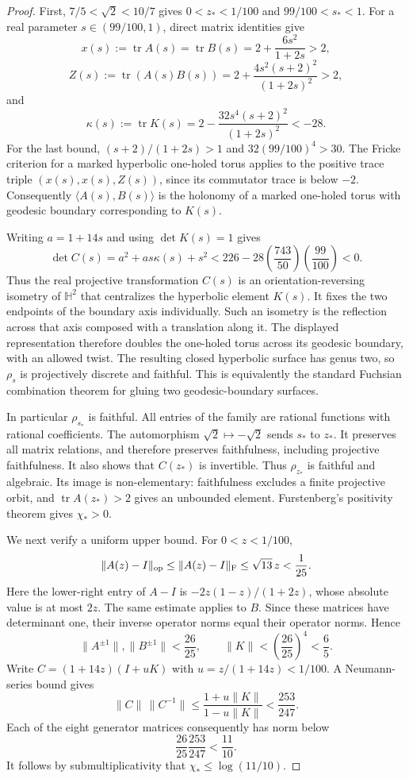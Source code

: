 \documentclass[11pt,letterpaper]{amsart}
\theoremstyle{definition}
\theoremstyle{remark}
\numberwithin{equation}{section}
\begin{document}
\begin{proof}
First, $7/5<\sqrt2<10/7$ gives $0<z_*<1/100$ and
$99/100<s_*<1$. For a real parameter $s\in(99/100,1)$, direct matrix
identities give
\[
 x(s):=\operatorname{tr}A(s)=\operatorname{tr}B(s)
       =2+\frac{6s^2}{1+2s}>2,
\]
\[
 Z(s):=\operatorname{tr}(A(s)B(s))
       =2+\frac{4s^2(s+2)^2}{(1+2s)^2}>2,
\]
and
\[
 \kappa(s):=\operatorname{tr}K(s)
       =2-\frac{32s^4(s+2)^2}{(1+2s)^2}<-28.
\]
For the last bound, $(s+2)/(1+2s)>1$ and
$32(99/100)^4>30$. The Fricke criterion \cite[Theorem 4.1.2]{GoldmanFricke} for a marked hyperbolic
one-holed torus applies to the positive trace triple
$(x(s),x(s),Z(s))$, since its commutator trace is below $-2$.
Consequently $\langle A(s),B(s)\rangle$ is the holonomy of a marked
one-holed torus with geodesic boundary corresponding to $K(s)$.

Writing $a=1+14s$ and using $\det K(s)=1$ gives
\[
 \det C(s)=a^2+as\kappa(s)+s^2
 <226-28\left(\frac{743}{50}\right)\left(\frac{99}{100}\right)<0.
\]
Thus the real projective transformation $C(s)$ is an
orientation-reversing isometry of $\mathbb H^2$ that centralizes the
hyperbolic element $K(s)$. It fixes the two endpoints of the boundary
axis individually. Such an isometry is the reflection across that axis
composed with a translation along it. The displayed representation
therefore doubles the one-holed torus across its geodesic boundary,
with an allowed twist. The resulting closed hyperbolic surface has
genus two, so $\rho_s$ is projectively discrete and faithful.
This is equivalently the standard Fuchsian combination theorem for
gluing two geodesic-boundary surfaces.

In particular $\rho_{s_*}$ is faithful. All entries of the family are
rational functions with rational coefficients. The automorphism
$\sqrt2\mapsto-\sqrt2$ sends $s_*$ to $z_*$. It preserves all matrix
relations, and therefore preserves faithfulness, including projective
faithfulness. It also shows that $C(z_*)$ is invertible. Thus
$\rho_{z_*}$ is faithful and algebraic. Its image is non-elementary:
faithfulness excludes a finite projective orbit, and
$\operatorname{tr}A(z_*)>2$ gives an unbounded element. Furstenberg's
positivity theorem gives $\chi_*>0$.

We next verify a uniform upper bound. For $0<z<1/100$,
\[
 \|A(z)-I\|_{\rm op}\le\|A(z)-I\|_{\rm F}
 \le\sqrt{13}\,z<\frac1{25}.
\]
Here the lower-right entry of $A-I$ is
$-2z(1-z)/(1+2z)$, whose absolute value is at most $2z$.
The same estimate applies to $B$. Since these matrices have determinant
one, their inverse operator norms equal their operator norms. Hence
\[
 \|A^{\pm1}\|,\|B^{\pm1}\|<\frac{26}{25},\qquad
 \|K\|<\left(\frac{26}{25}\right)^4<\frac65.
\]
Write $C=(1+14z)(I+uK)$ with $u=z/(1+14z)<1/100$. A Neumann-series
bound gives
\[
 \|C\|\,\|C^{-1}\|
 \le\frac{1+u\|K\|}{1-u\|K\|}<\frac{253}{247}.
\]
Each of the eight generator matrices consequently has norm below
\[
 \frac{26}{25}\frac{253}{247}<\frac{11}{10}.
\]
It follows by submultiplicativity that
$\chi_*\le\log(11/10)$.


\end{proof}
\end{document}
